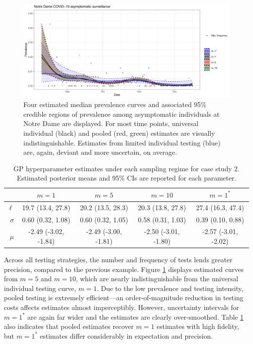\documentclass{article}
\begin{document}
\begin{figure}[h!]
\centerline{\includegraphics[width=\textwidth]{Figure3.pdf}}
\caption{Four estimated median prevalence curves and associated 95\% credible regions of prevalence among asymptomatic individuals at Notre Dame are displayed. For most time points, universal individual (black) and pooled (red, green) estimates are visually indistinguishable. Estimates from limited individual testing (blue) are, again, deviant and more uncertain, on average.\label{fig3}}
\end{figure}

\begin{table}[h]
\caption{GP hyperparameter estimates under each sampling regime for case study 2. Estimated posterior means and 95\% CIs are reported for each parameter.} \centering
\begin{tabular}{ r | c   c   c   c  } \toprule
        & $m=1$ & $m=5$ & $m=10$ &  $m=1^*$\\
\midrule
$\ell$ & 19.7 (13.4, 27.8) & 20.2 (13.5, 28.3)  & 20.3 (13.8, 27.8) & 27.4 (16.3, 47.4)   \\
$\sigma$ & 0.60 (0.32, 1.08) & 0.60 (0.32, 1.05) & 0.58 (0.31, 1.03)  & 0.39 (0.10, 0.88) \\
$\mu$ & -2.49 (-3.02, -1.84) &  -2.49 (-3.00, -1.81)  & -2.50 (-3.01, -1.80)  & -2.57 (-3.01, -2.02) \\
\bottomrule 
\end{tabular}
\label{t4}
\end{table}

Across all testing strategies, the number and frequency of tests lends greater precision, compared to the previous example. Figure \ref{fig3} displays estimated curves from $m=5$ and $m=10$, which are nearly indistinguishable from the universal individual testing curve, $m=1$. Due to the low prevalence and testing intensity, pooled testing is extremely efficient—an order-of-magnitude reduction in testing costs affects estimates almost imperceptibly. However, uncertainty intervals for $m=1^*$ are again far wider and the estimates are clearly over-smoothed. Table \ref{t4} also indicates that pooled estimates recover $m=1$ estimates with high fidelity, but $m=1^*$ estimates differ considerably in expectation and precision. 
\end{document}
